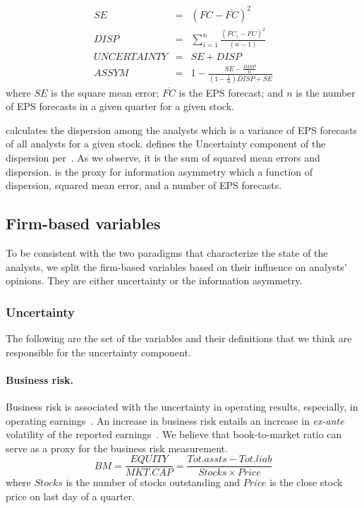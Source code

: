 \begin{eqnarray}
SE&=&(FC-\overline{FC})^2 \nonumber\\
DISP&=&\sum_{i=1}^{n} \frac{(FC_{i}-\overline{FC})^2}{(n-1)} \label{ch3-eq:disp} \\
UNCERTAINTY&=&SE+DISP \label{ch3-eq:uncert} \\
ASSYM & = & 1-\frac{SE-\frac{DISP}{n}}{\left( 1- \frac{1}{n}\right) DISP + SE } \label{ch3-eq:assym}
\end{eqnarray}
where $SE$ is the square mean error; $\overline{FC}$ is the EPS forecast;  and $n$ is the number of EPS forecasts in a given quarter for a given stock.

 calculates the dispersion among the analysts which is a variance of EPS forecasts of all analysts for a given stock.  defines the Uncertainty component of the dispersion per~\cite{barron2009}. As we observe, it is the sum of squared mean errors and dispersion.  is the proxy for information asymmetry which a function of dispersion, squared mean error, and a number of EPS forecasts.


\subsection{Firm-based variables}

To be consistent with the two paradigms that characterize the state of the analysts, we split the firm-based variables based on their influence on analysts' opinions. They are either uncertainty or the information asymmetry.

\subsubsection{Uncertainty}

The following are the set of the variables and their definitions that we think are responsible for the uncertainty component.

\paragraph{Business risk.} Business risk is associated with the uncertainty in operating results, especially, in operating earnings~\citep{hill1980}. An increase in business risk entails an increase in \emph{ex-ante} volatility of the reported earnings~\citep{parkash1995}.  We believe that  book-to-market ratio can serve as a proxy for the business risk measurement.
\begin{equation}
BM=\frac{EQUITY}{MKT.CAP}=\frac{Tot.assts-Tot.liab}{Stocks\times Price}
\end{equation}
where $Stocks$ is the number of stocks outstanding and $Price$ is the close stock price on last day of a quarter.

